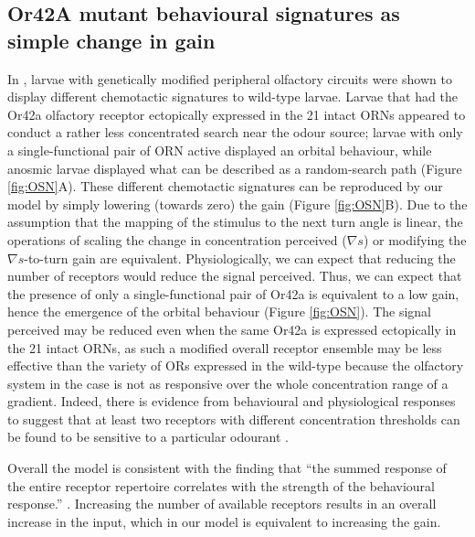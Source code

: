 \documentclass[11pt,a4paper]{article}
\begin{document}
\subsection{Or42A mutant behavioural signatures as simple change in gain}
In \cite{gomez2011active}, larvae with genetically modified peripheral olfactory circuits were shown to display different chemotactic signatures to wild-type larvae.
 Larvae that had the Or42a olfactory receptor ectopically expressed in the 21 intact ORNs appeared to conduct a rather less concentrated search near the odour source; larvae with only a single-functional pair of ORN active displayed an orbital behaviour, while anosmic larvae displayed what can be described as a random-search path (Figure \ref{fig:OSN}A).
 These different chemotactic signatures can be reproduced by our model by simply lowering (towards zero) the gain 
 (Figure \ref{fig:OSN}B).
 Due to the assumption that the mapping of the stimulus to the next turn angle is linear, the operations of scaling the change in concentration perceived ($\nabla s$) or modifying the $\nabla s$-to-turn gain are equivalent. Physiologically, we can expect that reducing the number of receptors would reduce the signal perceived. Thus, we can expect that the presence of only a single-functional pair of Or42a is equivalent to a low gain, hence the emergence of the orbital behaviour (Figure \ref{fig:OSN}).
 The signal perceived may be reduced even when the same Or42a is expressed ectopically in the 21 intact ORNs, as such a modified overall receptor ensemble may be less effective than the variety of ORs expressed in the wild-type because the olfactory system in the case is not as responsive over the whole concentration range of a gradient. Indeed, there is evidence from behavioural and physiological responses to suggest that at least two receptors with different concentration thresholds can be found to be sensitive to a particular odourant \citep{kreher2008translation}. 

Overall the model is consistent with the finding that ``the summed response of the entire receptor repertoire correlates with the strength of the behavioural response.” \citep{kreher2008translation}. Increasing the number of available receptors results in an overall increase in the input, which in our model is equivalent to increasing the gain.
\end{document}
